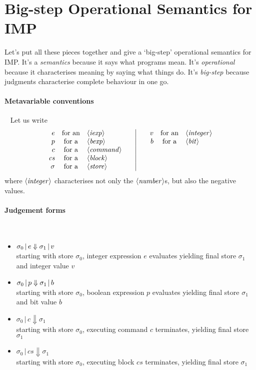 \documentclass{article}
\begin{document}
\section{Big-step Operational Semantics for IMP}


\newcommand{\execJ}[3]{#1 \,|\, #2 \Downarrow #3}
\newcommand{\cs}{\mathit{cs}}
\newcommand{\fbx}[1]{\framebox{\ensuremath{#1}}}

Let's put all these pieces together and give a `big-step' operational semantics for IMP. It's a \emph{semantics} because it says what programs mean. It's \emph{operational} because it characterises meaning by saying what things do. It's \emph{big-step} because judgments characterise complete behaviour in one go.

\paragraph{Metavariable conventions}~ Let us write
\[\begin{array}{rcl@{\qquad}|@{\qquad}rcl}
    e & \mbox{for an} & \NT{iexp} & v & \mbox{for an} & \NT{integer} \\
    p & \mbox{for a} & \NT{bexp} & b & \mbox{for a} & \NT{bit} \\
    c & \mbox{for a} & \NT{command} & & & \\
    \cs & \mbox{for a} & \NT{block} & & & \\
    \sigma & \mbox{for a} & \NT{store} &&&\\
\end{array}\]
where $\langle \mathit{integer} \rangle$ characterises not only the $\langle \mathit{number} \rangle$s, but also the negative values.

\paragraph{Judgement forms}~
\begin{itemize}
\item $\sigma_0 \,|\, e \Downarrow \sigma_1 \,|\, v$\\
  starting with store $\sigma_0$, integer expression $e$ evaluates yielding final store $\sigma_1$ and integer value $v$
\item $\sigma_0 \,|\, p \Downarrow \sigma_1 \,|\, b$\\
  starting with store $\sigma_0$, boolean expression $p$ evaluates yielding final store $\sigma_1$ and bit value $b$
\item $\execJ{\sigma_0}{c}{\sigma_1}$\\
  starting with store $\sigma_0$, executing command $c$ terminates, yielding final store $\sigma_1$ 
\item $\execJ{\sigma_0}{\cs}{\sigma_1}$\\
  starting with store $\sigma_0$, executing block $\cs$ terminates, yielding final store $\sigma_1$ 
\end{itemize}
\end{document}
